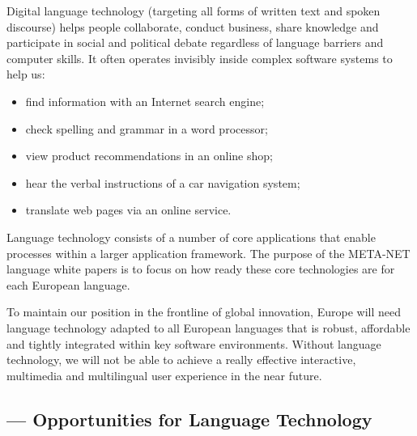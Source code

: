 \documentclass{scrartcl}
\begin{document}
\begin{Parallel}[c]{70mm}{70mm}
{    Digital language technology (targeting all forms of written text and spoken discourse) helps people collaborate, conduct business, share knowledge and participate in social and political debate regardless of language barriers and computer skills. It often operates invisibly inside complex software systems to help us:
    \begin{itemize}
      \item find information with an Internet search engine;
      \item check spelling and grammar in a word processor;
      \item view product recommendations in an online shop;
      \item hear the verbal instructions of a car navigation system;
      \item translate web pages via an online service.
    \end{itemize}
    Language technology consists of a number of core applications that enable processes within a larger application framework. The purpose of the META-NET language white papers is to focus on how ready these core technologies are for each European language.

    To maintain our position in the frontline of global innovation, Europe will need language technology adapted to all European languages that is robust, affordable and tightly integrated within key software environments. Without language technology, we will not be able to achieve a really effective interactive, multimedia and multilingual user experience in the near future.
  }

  \ParallelPar


  \subsection{ --- Opportunities for Language Technology }

  \MyParallelLText{





  }

\end{Parallel}
\end{document}
